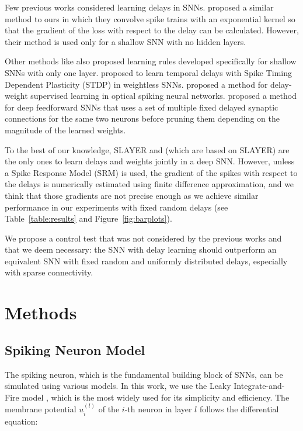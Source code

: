 \documentclass{article} \usepackage{iclr2024_conference,times}
\begin{document}
Few previous works considered learning delays in SNNs. \citet{Delay_Learning_Kernel} proposed a similar method to ours in which they convolve spike trains with an exponential kernel so that the gradient of the loss with respect to the delay can be calculated. However, their method is used only for a shallow SNN with no hidden layers. 

Other methods like \citet{related_delays1,related_delays1bis, related_delays2, related_delays3} also proposed learning rules developed specifically for shallow SNNs with only one layer. \citet{related_delays4} proposed to learn temporal delays with Spike Timing Dependent Plasticity (STDP) in weightless SNNs. \citet{DW_photonic} proposed a method for delay-weight supervised learning in optical spiking neural networks. \citet{iscas} proposed a method for deep feedforward SNNs that uses a set of multiple fixed delayed synaptic connections for the same two neurons before pruning them depending on the magnitude of the learned weights.

To the best of our knowledge, SLAYER \citep{slayer} and \citet{sun22, sun23, sun23-2} (which are based on SLAYER) are the only ones to learn delays and weights jointly in a deep SNN. However, unless a Spike Response Model (SRM) \citep{srm} is used, the gradient of the spikes with respect to the delays is numerically estimated using finite difference approximation, and we think that those gradients are not precise enough as we achieve similar performance in our experiments with fixed random delays (see Table~\ref{table:results} and Figure~\ref{fig:barplots}).

We propose a control test that was not considered by the previous works and that we deem necessary: the SNN with delay learning should outperform an equivalent SNN with fixed random and uniformly distributed delays, especially with sparse connectivity.




















\section{Methods}
\subsection{Spiking Neuron Model}
\label{methods:spiking}
The spiking neuron, which is the fundamental building block of SNNs, can be simulated using various models. In this work, we use the Leaky Integrate-and-Fire model \citep{gerstnerkistler2002}, which is the most widely used for its simplicity and efficiency. The membrane potential $u_i^{(l)}$ of the $i$-th neuron in layer $l$ follows the differential equation: 
\end{document}
